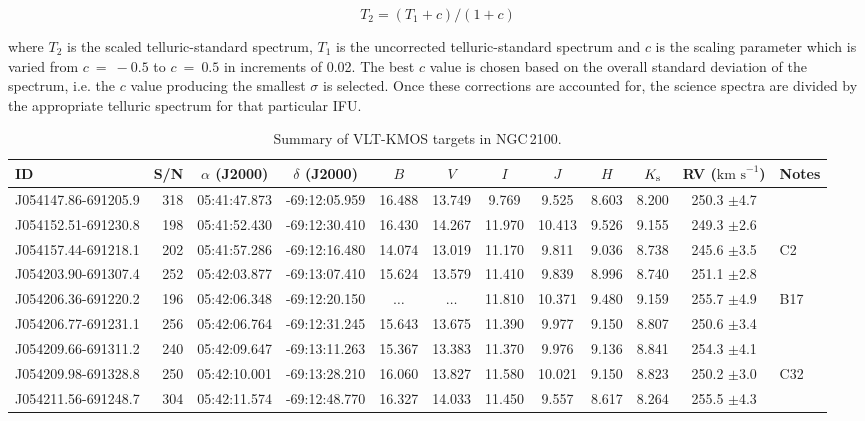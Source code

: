 \documentclass[useAMS,usenatbib]{mn2e}
\def\kms{$\mbox{km s}^{-1}$}
\begin{document}
\begin{equation}
  T_{2} = (T_{1} + c) / (1 + c)
\end{equation}

\noindent where $T_{2}$ is the scaled telluric-standard spectrum, $T_{1}$ is the uncorrected telluric-standard spectrum and $c$ is the scaling parameter which is varied from $c~=~-0.5$ to $c~=~0.5$ in increments of 0.02.
The best $c$ value is chosen based on the overall standard deviation of the spectrum, i.e. the $c$ value producing the smallest $\sigma$ is selected.
Once these corrections are accounted for, the science spectra are divided by the appropriate telluric spectrum for that particular IFU.


\begin{table}
\caption{
        Summary of VLT-KMOS targets in NGC\,2100.\label{tb:obs-params}
        }
\scriptsize
\begin{center}
\begin{tabular}{lrcccccccccl}
 \hline
 \hline
ID & S/N & $\alpha$ (J2000) & $\delta$ (J2000) & $B$ & $V$ & $I$ & $J$ & $H$ & $K_{\rm s}$ & RV (\kms) & Notes \\
 \hline
J054147.86-691205.9 & 318 & 05:41:47.873 & -69:12:05.959 & 16.488 & 13.749 &  9.769 &  9.525 &  8.603 & 8.200 &  250.3 $\pm$4.7\\
J054152.51-691230.8 & 198 & 05:41:52.430 & -69:12:30.410 & 16.430 & 14.267 & 11.970 & 10.413 &  9.526 & 9.155 &  249.3 $\pm$2.6\\
J054157.44-691218.1 & 202 & 05:41:57.286 & -69:12:16.480 & 14.074 & 13.019 & 11.170 &  9.811 &  9.036 & 8.738 &  245.6 $\pm$3.5 & C2\\
J054203.90-691307.4 & 252 & 05:42:03.877 & -69:13:07.410 & 15.624 & 13.579 & 11.410 &  9.839 &  8.996 & 8.740 &  251.1 $\pm$2.8\\
J054206.36-691220.2 & 196 & 05:42:06.348 & -69:12:20.150 &$\ldots$&$\ldots$& 11.810 & 10.371 &  9.480 & 9.159 &  255.7 $\pm$4.9 & B17\\
J054206.77-691231.1 & 256 & 05:42:06.764 & -69:12:31.245 & 15.643 & 13.675 & 11.390 &  9.977 &  9.150 & 8.807 &  250.6 $\pm$3.4\\
J054209.66-691311.2 & 240 & 05:42:09.647 & -69:13:11.263 & 15.367 & 13.383 & 11.370 &  9.976 &  9.136 & 8.841 &  254.3 $\pm$4.1\\
J054209.98-691328.8 & 250 & 05:42:10.001 & -69:13:28.210 & 16.060 & 13.827 & 11.580 & 10.021 &  9.150 & 8.823 &  250.2 $\pm$3.0 & C32\\
J054211.56-691248.7 & 304 & 05:42:11.574 & -69:12:48.770 & 16.327 & 14.033 & 11.450 &  9.557 &  8.617 & 8.264 &  255.5 $\pm$4.3\\

\end{tabular}
\end{center}
\end{table}
\end{document}
